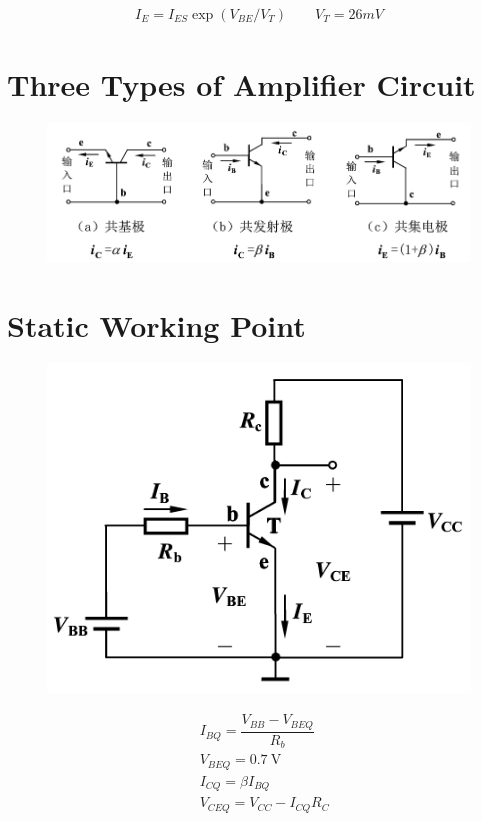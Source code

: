 \begin{equation*}
  \begin{aligned}
    I_E = I_{ES} \exp \left( V_{BE} / V_T \right) \quad\quad V_T = 26 \si{mV}
  \end{aligned}
\end{equation*}


\section{Three Types of Amplifier Circuit}

\begin{figure}[H]
  \centering
  \includegraphics[width=0.9\linewidth]{figures/BJT-three-types}
  \label{fig:}
\end{figure}

\section{Static Working Point}

\begin{figure}[H]
  \centering
  \includegraphics[width=0.4\linewidth]{figures/BJT-static}
  \label{fig:}
\end{figure}

\begin{equation*}
  \begin{aligned}
    & I_{BQ} = \dfrac{V_{BB} - V_{BEQ}}{R_b} \\
    & V_{BEQ} = 0.7 \  \mathrm{V} \\
    & I_{CQ} = \beta I_{BQ} \\
    & V_{CEQ} = V_{CC} - I_{CQ} R_{C}
  \end{aligned}
\end{equation*}

